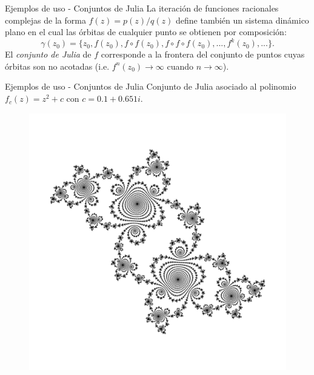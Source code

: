 \documentclass{beamer}
\begin{document}
\begin{frame}{Ejemplos de uso - Conjuntos de Julia}
La iteración de funciones racionales complejas de la forma $f(z) = p(z) / q(z)$ define también un sistema dinámico plano en el cual las órbitas de cualquier punto se obtienen por composición:
$$ \gamma(z_0) = \{z_0, f(z_0), f\circ f(z_0), f \circ f \circ f(z_0), ..., f^k(z_0), ...\}. $$
El \emph{conjunto de Julia} de $f$ corresponde a la frontera del conjunto de puntos cuyas órbitas son no acotadas (i.e. $f^n(z_0) \to \infty$ cuando $n \to \infty$).
\end{frame}


\begin{frame}{Ejemplos de uso - Conjuntos de Julia}
Conjunto de Julia asociado al polinomio $f_c(z) = z^2 + c$ con $c = 0.1 + 0.651i$.
\begin{figure}[!ht] \centering
 \includegraphics[scale=0.1]{figures/juliaset.png}
\end{figure}
\end{frame}
\end{document}
